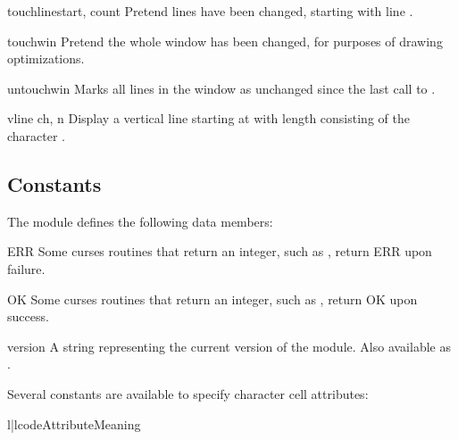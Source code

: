 \begin{methoddesc}{touchline}{start, count}
Pretend  lines have been changed, starting with line
.
\end{methoddesc}

\begin{methoddesc}{touchwin}{}
Pretend the whole window has been changed, for purposes of drawing
optimizations.
\end{methoddesc}

\begin{methoddesc}{untouchwin}{}
Marks all lines in  the  window  as unchanged since the last call to
. 
\end{methoddesc}

\begin{methoddesc}{vline}{ ch, n}
Display a vertical line starting at  with
length  consisting of the character .
\end{methoddesc}

\subsection{Constants}

The  module defines the following data members:

\begin{datadesc}{ERR}
Some curses routines  that  return  an integer, such as 
, return ERR upon failure.  
\end{datadesc}

\begin{datadesc}{OK}
Some curses routines  that  return  an integer, such as 
, return OK upon success.  

\end{datadesc}

\begin{datadesc}{version}
A string representing the current version of the module. 
Also available as .
\end{datadesc}

Several constants are available to specify character cell attributes:

\begin{tableii}{l|l}{code}{Attribute}{Meaning}
\end{tableii}

